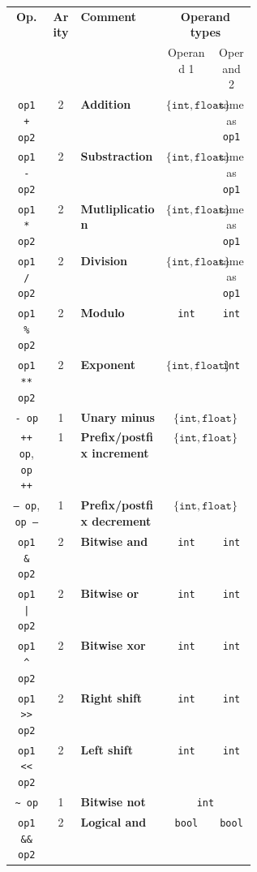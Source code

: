 \documentclass[a4paper,11pt]{article}
\begin{document}
\begin{table}
	\center
	\begin{tabular}{|c|c|p{0.35\linewidth}|cc|}
	\hline
	\multirow{2}{*}{\textbf{Op.}} & \multirow{2}{*}{\textbf{Arity}} & \multirow{2}{*}{\textbf{Comment}} & \multicolumn{2}{c|}{\textbf{Operand types}} \\
	 & & & Operand 1 & Operand 2 \\
	\hline
	\texttt{op1 + op2} & 2 & \textbf{Addition}  & $\{\texttt{int}, \texttt{float}\}$ & same as \texttt{op1}\\
	\texttt{op1 - op2} & 2 & \textbf{Substraction} & $\{\texttt{int}, \texttt{float}\}$ & same as \texttt{op1}\\
	\texttt{op1 * op2} & 2 & \textbf{Mutliplication} & $\{\texttt{int}, \texttt{float}\}$ & same as \texttt{op1}\\
	\texttt{op1 / op2} & 2 & \textbf{Division}  & $\{\texttt{int}, \texttt{float}\}$ & same as \texttt{op1}\\
	\texttt{op1 \% op2} & 2 & \textbf{Modulo} & \texttt{int} & \texttt{int} \\
	\texttt{op1 ** op2} & 2 & \textbf{Exponent} & $\{\texttt{int}, \texttt{float}\}$ & \texttt{int} \\
	\texttt{- op} & 1 & \textbf{Unary minus} & \multicolumn{2}{c|}{$\{\texttt{int}, \texttt{float}\}$}\\
	\texttt{++ op}, \texttt{op ++} & 1 & \textbf{Prefix/postfix increment} & \multicolumn{2}{c|}{$\{\texttt{int}, \texttt{float}\}$}\\
	\texttt{-- op}, \texttt{op --} & 1 & \textbf{Prefix/postfix decrement} & \multicolumn{2}{c|}{$\{\texttt{int}, \texttt{float}\}$}\\
	\texttt{op1 \& op2} & 2 & \textbf{Bitwise and} & \texttt{int} & \texttt{int} \\
	\texttt{op1 | op2} & 2 & \textbf{Bitwise or} & \texttt{int} & \texttt{int} \\
	\texttt{op1 \^{} op2} & 2 & \textbf{Bitwise xor} & \texttt{int} & \texttt{int} \\
	\texttt{op1 >> op2} & 2 & \textbf{Right shift} & \texttt{int} & \texttt{int} \\
	\texttt{op1 << op2} & 2 & \textbf{Left shift} & \texttt{int} & \texttt{int} \\
	\texttt{\~{} op} & 1 & \textbf{Bitwise not} & \multicolumn{2}{c|}{\texttt{int}}\\
	\texttt{op1 \&\& op2} & 2 & \textbf{Logical and} & \texttt{bool} & \texttt{bool} \\

\end{tabular}
\end{table}
\end{document}
